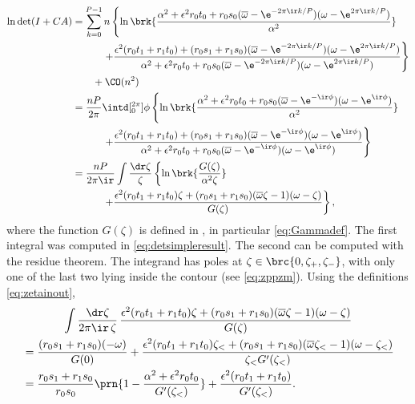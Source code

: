 \documentclass[12pt]{article}
\newcommand{\omb}{\overline{\omega}}
\begin{document}
\begin{equation}\label{eq:detrepints}
\begin{aligned}
  \ln\det(I+CA) &=  \sum_{k=0}^{P-1}
    n \left\{
      \ln\brk{ \frac{\alpha^2+\epsilon^2r_0t_0 + r_0s_0 (\omb-\e^{-2\pi\ir k/P}) (\omega-\e^{2\pi\ir k/P})} {\alpha^2}}
    \right.\\
    &\qquad\quad \left.+
      \frac{ \epsilon^2 (r_0t_1+r_1t_0) + (r_0s_1+r_1s_0) (\omb-\e^{-2\pi\ir k/P}) (\omega-\e^{2\pi\ir k/P})} { \alpha^2+\epsilon^2r_0t_0 + r_0s_0 (\omb-\e^{-2\pi\ir k/P}) (\omega-\e^{2\pi\ir k/P})}
    \right\}\\
   &\qquad +\CO(n^2)\\
    &= \frac{nP}{2\pi} \intd[_0^{2\pi}]{\phi} \left\{
     \ln\brk{ \frac{\alpha^2+\epsilon^2r_0t_0 + r_0s_0 (\omb-\e^{-\ir\phi}) (\omega-\e^{\ir\phi})} {\alpha^2}}
    \right.\\
    &\qquad\quad \left.+
      \frac{ \epsilon^2 (r_0t_1+r_1t_0) + (r_0s_1+r_1s_0) (\omb-\e^{-\ir\phi}) (\omega-\e^{\ir\phi})} { \alpha^2+\epsilon^2r_0t_0 + r_0s_0 (\omb-\e^{-\ir\phi}) (\omega-\e^{\ir\phi})}
    \right\}\\
    &= \frac{nP}{2\pi\ir} \int \frac{\dr\zeta}{\zeta} \left\{ \ln \brk{\frac{G(\zeta)}{\alpha^2\zeta}}
    \right.\\
    &\qquad\quad \left.+
      \frac{ \epsilon^2 (r_0t_1+r_1t_0)\zeta + (r_0s_1+r_1s_0) (\omb\zeta-1) (\omega-\zeta)} {G(\zeta)}
    \right\},
\end{aligned}
\end{equation}
%
where the function $G(\zeta)$ is defined in , in particular \eqref{eq:Gammadef}.
The first integral was computed in \eqref{eq:detsimpleresult}.
The second can be computed with the residue theorem.
The integrand has poles at $\zeta\in\brc{0,\zeta_+,\zeta_-}$, with only one of the last two lying inside the contour (see \eqref{eq:zppzm}).
Using the definitions \eqref{eq:zetainout},
%
\begin{multline}\label{eq:repcontoutint}
  \int \frac{\dr\zeta}{2\pi\ir\,\zeta}\,
    \frac{ \epsilon^2 (r_0t_1+r_1t_0)\zeta + (r_0s_1+r_1s_0) (\omb\zeta-1) (\omega-\zeta)} {G(\zeta)} \\
    \begin{aligned}
      &= \frac{(r_0s_1+r_1s_0)(-\omega)}{G(0)}
      + \frac{ \epsilon^2 (r_0t_1+r_1t_0)\zeta_< + (r_0s_1+r_1s_0) (\omb\zeta_<-1) (\omega-\zeta_<)} {\zeta_< G'(\zeta_<)} \\
      &= \frac{r_0s_1+r_1s_0}{r_0s_0}\prn{1-\frac{\alpha^2+\epsilon^2r_0t_0} {G'(\zeta_<)}}
      + \frac{ \epsilon^2 (r_0t_1+r_1t_0)} {G'(\zeta_<)} .
    \end{aligned}
\end{multline}
%
\end{document}
